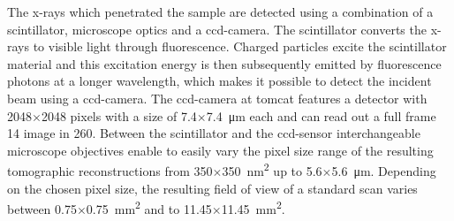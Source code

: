 The x-rays which penetrated the sample are detected using a combination of a scintillator, microscope optics and a \ac{ccd}-camera. The scintillator converts the x-rays to visible light through fluorescence. Charged particles excite the scintillator material and this excitation energy is then subsequently emitted by fluorescence photons at a longer wavelength, which  makes it possible to detect the incident beam using a \ac{ccd}-camera. The \ac{ccd}-camera at \ac{tomcat} features a detector with 2048$\times$2048 pixels with a size of 7.4$\times$\SI{7.4}{\micro\meter} each and can read out a full frame \SI{14}{\bit} image in \SI{260}{\millisecond}. Between the scintillator and the \ac{ccd}-sensor interchangeable microscope objectives enable to easily vary the pixel size range of the resulting tomographic reconstructions from 350$\times$\SI{350}{\nano\meter\squared}  up to 5.6$\times$\SI{5.6}{\micro\meter}. Depending on the chosen pixel size, the resulting field of view of a standard scan varies between 0.75$\times$\SI{0.75}{\milli\meter\squared} and to 11.45$\times$\SI{11.45}{\milli\meter\squared}.

